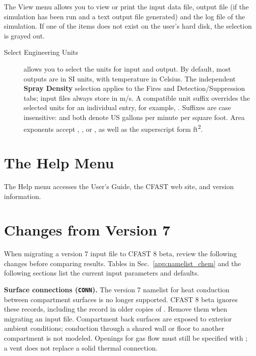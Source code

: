 The View menu allows you to view or print the input data file, output file (if the simulation has been run and a text output file generated) and the log file of the simulation. If one of the items does not exist on the user's hard disk, the selection is grayed out.
\begin{description}
\item[Select Engineering Units] allows you to select the units for input and output. By default, most outputs are in SI units, with temperature in Celsius. The independent \textbf{Spray Density} selection applies to the Fires and Detection/Suppression tabs; input files always store  in m/s. A compatible unit suffix overrides the selected units for an individual entry, for example, . Suffixes are case insensitive:  and  both denote US gallons per minute per square foot. Area exponents accept , , or , as well as the superscript form ft\textsuperscript{2}.
\end{description}


\section{The Help Menu}

The Help menu accesses the User's Guide, the CFAST web site, and version information.


\section[Changes from Version 7]{Changes from Version 7}
\label{sec:changes_from_v7}

When migrating a version 7 input file to CFAST 8 beta, review the following changes before comparing results. Tables in Sec.~\ref{app:namelist_chem} and the following sections list the current input parameters and defaults.

\noindent\textbf{Surface connections (\texttt{CONN}).} The version 7  namelist for heat conduction between compartment surfaces is no longer supported. CFAST 8 beta ignores these records, including the  record in older copies of . Remove them when migrating an input file. Compartment back surfaces are exposed to exterior ambient conditions; conduction through a shared wall or floor to another compartment is not modeled. Openings for gas flow must still be specified with ; a vent does not replace a solid thermal connection.

